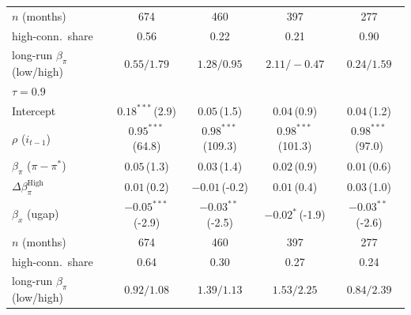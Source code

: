 \begin{tabular}{lcccc}
\addlinespace
$n$ (months) & 674 & 460 & 397 & 277 \\
high-conn.\ share & 0.56 & 0.22 & 0.21 & 0.90 \\
long-run $\beta_\pi$ (low/high) & $0.55/1.79$ & $1.28/0.95$ & $2.11/-0.47$ & $0.24/1.59$ \\
\midrule
\multicolumn{5}{l}{\textit{$\tau=0.9$}} \\
Intercept & $0.18^{***}$\,{\scriptsize(2.9)} & $0.05$\,{\scriptsize(1.5)} & $0.04$\,{\scriptsize(0.9)} & $0.04$\,{\scriptsize(1.2)} \\
$\rho$ ($i_{t-1}$) & $0.95^{***}$\,{\scriptsize(64.8)} & $0.98^{***}$\,{\scriptsize(109.3)} & $0.98^{***}$\,{\scriptsize(101.3)} & $0.98^{***}$\,{\scriptsize(97.0)} \\
$\beta_\pi$ ($\pi-\pi^*$) & $0.05$\,{\scriptsize(1.3)} & $0.03$\,{\scriptsize(1.4)} & $0.02$\,{\scriptsize(0.9)} & $0.01$\,{\scriptsize(0.6)} \\
$\Delta\beta_\pi^{\text{High}}$ & $0.01$\,{\scriptsize(0.2)} & $-0.01$\,{\scriptsize(-0.2)} & $0.01$\,{\scriptsize(0.4)} & $0.03$\,{\scriptsize(1.0)} \\
$\beta_x$ (ugap) & $-0.05^{***}$\,{\scriptsize(-2.9)} & $-0.03^{**}$\,{\scriptsize(-2.5)} & $-0.02^{*}$\,{\scriptsize(-1.9)} & $-0.03^{**}$\,{\scriptsize(-2.6)} \\
\addlinespace
$n$ (months) & 674 & 460 & 397 & 277 \\
high-conn.\ share & 0.64 & 0.30 & 0.27 & 0.24 \\
long-run $\beta_\pi$ (low/high) & $0.92/1.08$ & $1.39/1.13$ & $1.53/2.25$ & $0.84/2.39$ \\
\bottomrule
\end{tabular}
